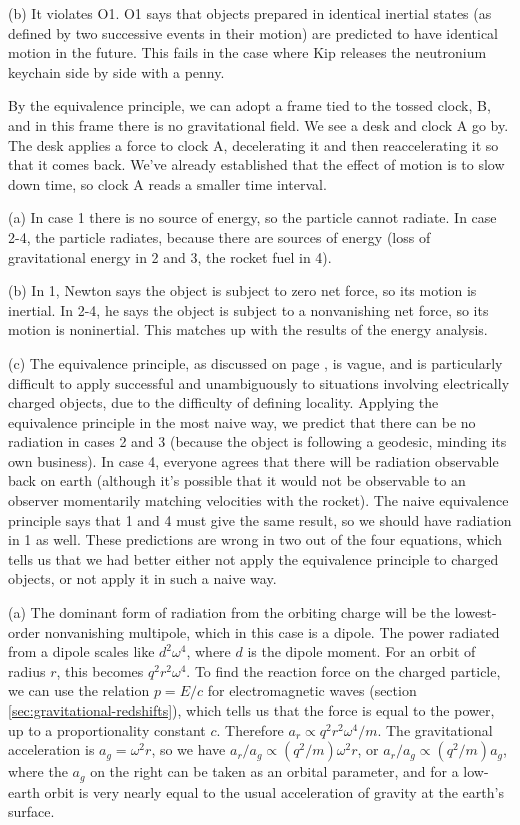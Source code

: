 (b) It violates O1. O1 says that objects prepared in identical inertial states
(as defined by two successive events in their motion) are predicted to have
identical motion in the future. This fails in the case where Kip releases the
neutronium keychain side by side with a penny.

By the equivalence principle, we can adopt a frame tied to the tossed clock, B, and in this
frame there is no gravitational field. We see a desk and clock A go by. The desk applies
a force to clock A, decelerating it and then reaccelerating it so that it comes back.
We've already established that the effect of motion is to slow down time, so clock
A reads a smaller time interval.

(a) In case 1 there is no source of energy, so the particle cannot radiate.
In case 2-4, the particle radiates, because there are sources of energy (loss of
gravitational energy in 2 and 3, the rocket fuel in 4).

(b) In 1, Newton says the object is subject to zero net force, so its motion
is inertial. In 2-4, he says the object is subject to a nonvanishing net force,
so its motion is noninertial. This matches up with the results of the energy analysis.

(c) The equivalence principle, as discussed on page \pageref{sec:chiao-paradox},
is vague, and is particularly difficult to apply successful and unambiguously to
situations involving electrically charged objects, due to the difficulty of
defining locality. Applying the equivalence principle in the most naive way,
we predict that there can be no radiation in cases 2 and 3 (because the object is
following a geodesic, minding its own business).
In case 4, everyone agrees that there will be radiation observable back on earth
(although it's possible that it would not be observable to an observer momentarily
matching velocities with the rocket).
The naive equivalence principle says that 1 and 4 must give the same result, so
we should have radiation in 1 as well. These predictions are wrong in two out of
the four equations, which tells us that we had better either not apply the equivalence
principle to charged objects, or not apply it in such a naive way.


(a) The dominant form of radiation from the orbiting charge will be the lowest-order
nonvanishing multipole, which in this case is a dipole. The power radiated from
a dipole scales like $d^2\omega^4$, where $d$ is the dipole moment. For an orbit of
radius $r$, this becomes $q^2r^2\omega^4$. To find the reaction force on the charged particle,
we can use the relation $p=E/c$ for electromagnetic waves (section \ref{sec:gravitational-redshifts}),
which tells us that the force is equal to the power, up to a proportionality constant $c$.
Therefore $a_r\propto q^2r^2\omega^4/m$. The gravitational acceleration is $a_g=\omega^2 r$,
so we have $a_r/a_g \propto (q^2/m)\omega^2 r$, or $a_r/a_g \propto (q^2/m)a_g$, where the
$a_g$ on the right can be taken as an orbital parameter, and for a low-earth orbit is very nearly equal to
the usual acceleration of gravity at the earth's surface.


